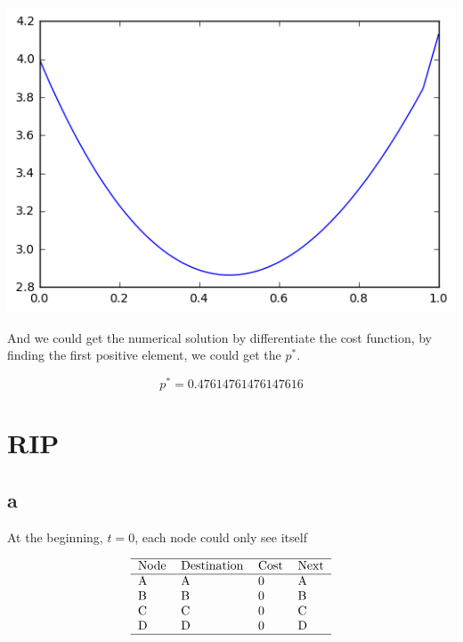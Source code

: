 \documentclass[12pt,a4paper]{article}
\begin{document}
\includegraphics{PIC/cost.png}

And we could get the numerical solution by differentiate the cost function, by finding the first positive element, we could get the $p^*$.

\begin{equation}
p^* = 0.47614761476147616
\end{equation}

\section{RIP}

\subsection{a}
At the beginning, $t=0$, each node could only see itself


\begin{equation}
\begin{tabular}{ l l l l }
\hline
Node & Destination & Cost & Next \\
\hline
 A & A & 0 & A\\
 B & B & 0 & B\\
 C & C & 0 & C\\
 D & D & 0 & D\\
\hline
\end{tabular}
\end{equation}
\end{document}
